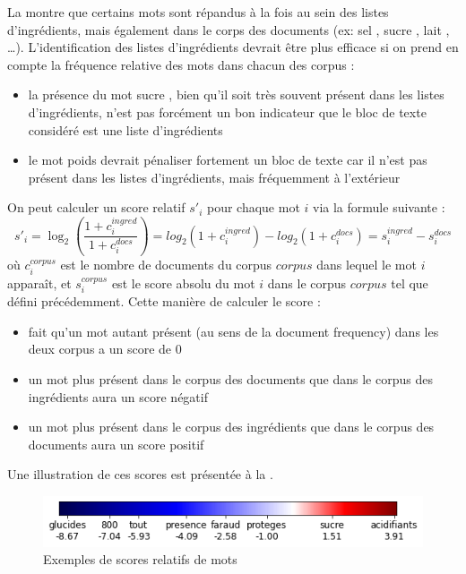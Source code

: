         La  montre que certains mots sont répandus à la fois au sein des listes d'ingrédients, mais également dans le corps des documents (ex: \og sel \fg, \og sucre \fg, \og lait \fg, \dots).
        L'identification des listes d'ingrédients devrait être plus efficace si on prend en compte la fréquence relative des mots dans chacun des corpus : 
        \begin{itemize}
            \item la présence du mot \og sucre \fg, bien qu'il soit très souvent présent dans les listes d'ingrédients, n'est pas forcément un bon indicateur que le bloc de texte considéré est une liste d'ingrédients
            \item le mot \og poids \fg devrait pénaliser fortement un bloc de texte car il n'est pas présent dans les listes d'ingrédients, mais fréquemment à l'extérieur
        \end{itemize}
        On peut calculer un score relatif $s'_{i}$ pour chaque mot $i$ via la formule suivante :
        \[s'_{i} = \log_{2}(\frac{1 + c^{ingred}_{i}}{1 + c^{docs}_{i}}) = log_{2}(1 + c^{ingred}_{i}) - log_{2}(1 + c^{docs}_{i}) = s^{ingred}_{i} - s^{docs}_{i}\]
        où $c^{corpus}_{i}$ est le nombre de documents du corpus $corpus$ dans lequel le mot $i$ apparaît, et $s^{corpus}_{i}$ est le score absolu du mot $i$ dans le corpus $corpus$ tel que défini précédemment.
        Cette manière de calculer le score : 
        \begin{itemize}
            \item fait qu'un mot autant présent (au sens de la document frequency) dans les deux corpus a un score de $0$
            \item un mot plus présent dans le corpus des documents que dans le corpus des ingrédients aura un score négatif
            \item un mot plus présent dans le corpus des ingrédients que dans le corpus des documents aura un score positif
        \end{itemize}
        Une illustration de ces scores est présentée à la .

        \begin{figure}[htbp]
            \begin{center}
            \includegraphics[width=0.6\linewidth]{img/relative_score_bar.png}
            \end{center}
            \caption{Exemples de scores relatifs de mots}
            \label{fig:relative_score_bar}
        \end{figure} 


